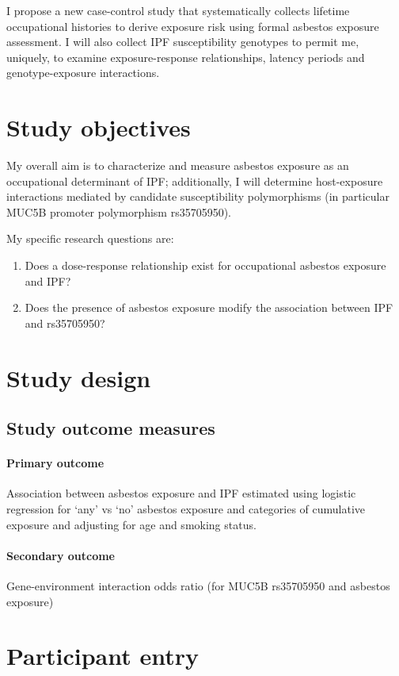 \documentclass[a4paper,10pt]{article}
\begin{document}
I propose a new case-control study that systematically collects lifetime occupational histories to derive exposure risk using formal asbestos exposure assessment. I will also collect IPF susceptibility genotypes to permit me, uniquely, to examine exposure-response relationships, latency periods and genotype-exposure interactions. 

\section{Study objectives}
My overall aim is to characterize and measure asbestos exposure as an occupational determinant of IPF; additionally, I will determine host-exposure interactions mediated by candidate susceptibility polymorphisms (in particular MUC5B promoter polymorphism rs35705950). 

My specific research questions are:
 \begin{enumerate} 
 \item Does a dose-response relationship exist for occupational asbestos exposure and IPF? 
 \item Does the presence of asbestos exposure modify the association between IPF and rs35705950? 
 \end{enumerate} 

\section{Study design}
\subsection{Study outcome measures}
\paragraph{Primary outcome}
Association between asbestos exposure and IPF estimated using logistic regression for ‘any’ vs ‘no’ asbestos exposure and categories of cumulative exposure and adjusting for age and smoking status.

\paragraph{Secondary outcome}
Gene-environment interaction odds ratio (for MUC5B rs35705950 and asbestos exposure)

\section{Participant entry}
\end{document}
